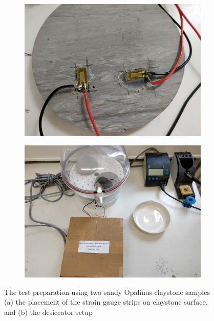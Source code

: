 \
\begin{figure}[!ht]
\begin{subfigure}[c]{0.48\textwidth}
\includegraphics[width=1\textwidth]{figures/Amir_Shrinkage_Sensors.png}
\subcaption{}
\label{fig:Amir_Shrinkage_Sensors}
\end{subfigure}
\hfill
\begin{subfigure}[c]{0.48\textwidth}
\includegraphics[width=1\textwidth]{figures/Amir_Shrinkage_Full_Setup.png}
\subcaption{}
\label{fig:Amir_Shrinkage_Full_Setup}
\end{subfigure}
\caption{The test preparation using two sandy Opalinus claystone samples (a) the placement of the strain gauge strips on claystone surface, and (b) the desiccator setup}
\end{figure}

